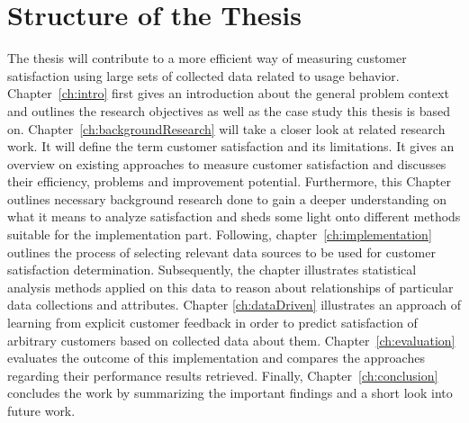 \section{Structure of the Thesis}
The thesis will contribute to a more efficient way of measuring customer satisfaction using large sets of collected data related to usage behavior. Chapter~\ref{ch:intro} first gives an introduction about the general problem context and outlines the research objectives as well as the case study this thesis is based on. Chapter~\ref{ch:backgroundResearch} will take a closer look at related research work. It will define the term customer satisfaction and its limitations. It gives an overview on existing approaches to measure customer satisfaction and discusses their efficiency, problems and improvement potential. Furthermore, this Chapter outlines necessary background research done to gain a deeper understanding on what it means to analyze satisfaction and sheds some light onto different methods suitable for the implementation part. Following, chapter~\ref{ch:implementation} outlines the process of selecting relevant data sources to be used for customer satisfaction determination. Subsequently, the chapter illustrates statistical analysis methods applied on this data to reason about relationships of particular data collections and attributes. Chapter \ref{ch:dataDriven} illustrates an approach of learning from explicit customer feedback in order to predict satisfaction of arbitrary customers based on collected data about them. Chapter~\ref{ch:evaluation} evaluates the outcome of this implementation and compares the approaches regarding their performance results retrieved. Finally, Chapter~\ref{ch:conclusion} concludes the work by summarizing the important findings and  a short look into future work.